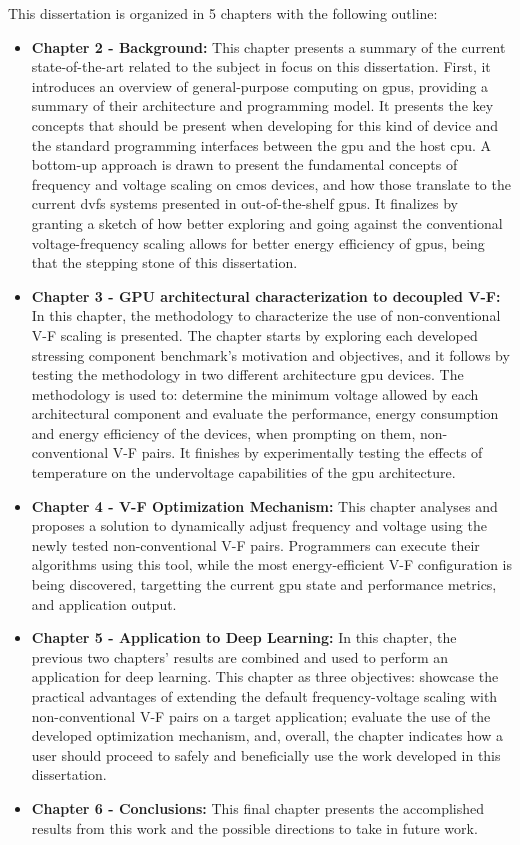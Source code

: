 This dissertation is organized in 5 chapters with the following outline:
\begin{itemize}
    \item \textbf{Chapter 2 - Background:} This chapter presents a summary of the current state-of-the-art related to the subject in focus on this dissertation. First, it introduces an overview of general-purpose computing on \acrshort{gpu}s, providing a summary of their architecture and programming model. It presents the key concepts that should be present when developing for this kind of device and the standard programming interfaces between the \acrshort{gpu} and the host  \acrshort{cpu}. A bottom-up approach is drawn to present the fundamental concepts of frequency and voltage scaling on \acrshort{cmos} devices, and how those translate to the current \acrshort{dvfs} systems presented in out-of-the-shelf \acrshort{gpu}s. It finalizes by granting a sketch of how better exploring and going against the conventional voltage-frequency scaling allows for better energy efficiency of \acrshort{gpu}s, being that the stepping stone of this dissertation. 
    \item \textbf{Chapter 3 - GPU architectural characterization to decoupled V-F:} In this chapter, the methodology to characterize the use of non-conventional V-F scaling is presented. The chapter starts by exploring each developed stressing component benchmark's motivation and objectives, and it follows by testing the methodology in two different architecture \acrshort{gpu} devices. The methodology is used to: determine the minimum voltage allowed by each architectural component and evaluate the performance, energy consumption and energy efficiency of the devices, when prompting on them, non-conventional V-F pairs. It finishes by experimentally testing the effects of temperature on the undervoltage capabilities of the \acrshort{gpu} architecture.
    \item \textbf{Chapter 4 - V-F Optimization Mechanism:} This chapter analyses and proposes a solution to dynamically adjust frequency and voltage using the newly tested non-conventional V-F pairs. Programmers can execute their algorithms using this tool, while the most energy-efficient V-F configuration is being discovered, targetting the current \acrshort{gpu} state and performance metrics, and application output.
    \item \textbf{Chapter 5 - Application to Deep Learning:} In this chapter, the previous two chapters' results are combined and used to perform an application for deep learning. This chapter as three objectives: showcase the practical advantages of extending the default frequency-voltage scaling with non-conventional V-F pairs on a target application; evaluate the use of the developed optimization mechanism, and, overall, the chapter indicates how a user should proceed to safely and beneficially use the work developed in this dissertation.
    \item \textbf{Chapter 6 - Conclusions:} This final chapter presents the accomplished results from this work and the possible directions to take in future work.
\end{itemize}

